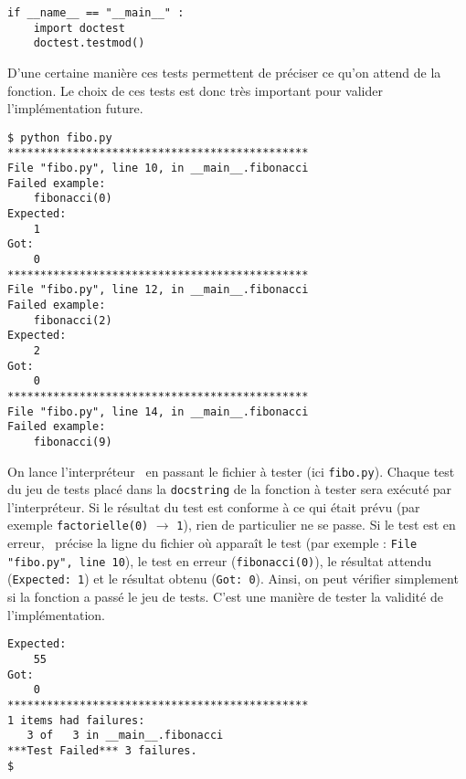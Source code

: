 \noindent\mbox{}\hspace*{1cm}\begin{py}{6cm}
\begin{verbatim}
if __name__ == "__main__" :
    import doctest
    doctest.testmod()
\end{verbatim}
\end{py}
\hspace*{1cm}\mbox{}\vspace*{2mm}

\noindent D'une certaine manière ces tests permettent de préciser ce qu'on attend de la fonction.
Le choix de ces tests est donc très important pour valider l'implémentation future.

\noindent\mbox{}\hspace*{1cm}\begin{py}{6cm}
\begin{verbatim}
$ python fibo.py
**********************************************
File "fibo.py", line 10, in __main__.fibonacci
Failed example:
    fibonacci(0)
Expected:
    1
Got:
    0
**********************************************
File "fibo.py", line 12, in __main__.fibonacci
Failed example:
    fibonacci(2)
Expected:
    2
Got:
    0
**********************************************
File "fibo.py", line 14, in __main__.fibonacci
Failed example:
    fibonacci(9)
\end{verbatim}
\end{py}
\hfill
\begin{py}{6cm}
On lance l'interpréteur \python\ en passant le fichier à tester
(ici {\tt fibo.py}). Chaque test du jeu de tests placé dans
la {\tt docstring} de la fonction à tester sera exécuté par
l'interpréteur. Si le résultat du test est conforme à ce qui était prévu
(par exemple {\tt factorielle(0)} $\rightarrow$ {\tt 1}), rien de particulier
ne se passe. Si le test est en erreur, \python\ précise
la ligne du fichier où apparaît le test
(par exemple : {\tt File "fibo.py", line 10}), le test en
erreur ({\tt fibonacci(0)}), le résultat attendu
({\tt Expected: 1}) et le résultat obtenu ({\tt Got: 0}).
Ainsi, on peut vérifier simplement si la fonction
a passé le jeu de tests. C'est une manière de tester la validité 
de l'implémentation.
\end{py}

\noindent\mbox{}\hspace*{1cm}\begin{py}{6cm}
\begin{verbatim}
Expected:
    55    
Got:
    0
**********************************************
1 items had failures:
   3 of   3 in __main__.fibonacci
***Test Failed*** 3 failures.
$
\end{verbatim}
\end{py}
\hspace*{1cm}\mbox{}\vspace*{2mm}

